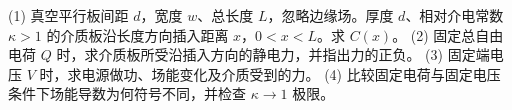 (1) 真空平行板间距 \(d\)，宽度 \(w\)、总长度 \(L\)，忽略边缘场。厚度 \(d\)、相对介电常数 \(\kappa>1\) 的介质板沿长度方向插入距离 \(x\)，\(0<x<L\)。求 \(C(x)\)。
(2) 固定总自由电荷 \(Q\) 时，求介质板所受沿插入方向的静电力，并指出力的正负。
(3) 固定端电压 \(V\) 时，求电源做功、场能变化及介质受到的力。
(4) 比较固定电荷与固定电压条件下场能导数为何符号不同，并检查 \(\kappa\to1\) 极限。
